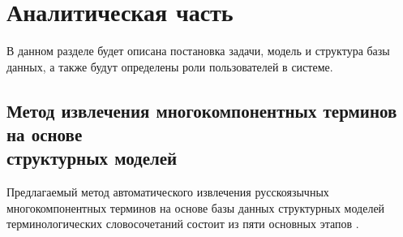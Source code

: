 \section{Аналитическая часть}

В данном разделе будет описана постановка задачи, модель и структура базы данных, а также будут определены роли пользователей в системе.

\subsection{Метод извлечения многокомпонентных терминов на основе \\структурных моделей}

Предлагаемый метод автоматического извлечения русскоязычных многокомпонентных терминов на основе базы данных структурных моделей терминологических словосочетаний состоит из пяти основных этапов \cite{My_article_2021}.

